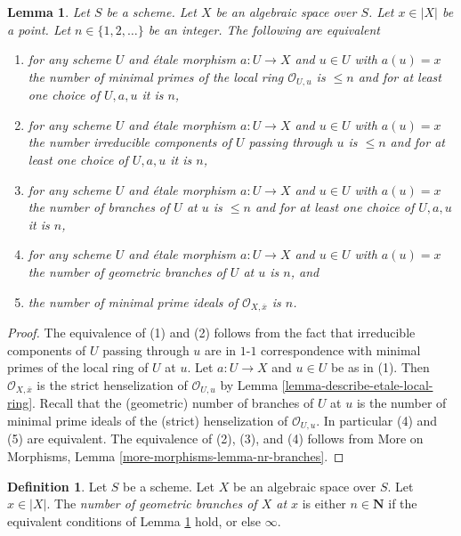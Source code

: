 \documentclass{stacks-project}
\theoremstyle{plain}
\newtheorem{lemma}[subsection]{Lemma}
\theoremstyle{definition}
\newtheorem{definition}[subsection]{Definition}
\theoremstyle{remark}
\numberwithin{equation}{subsection}
\begin{document}
\begin{lemma}
\label{lemma-nr-branches-local-ring}
Let $S$ be a scheme. Let $X$ be an algebraic space over $S$.
Let $x \in |X|$ be a point. Let $n \in \{1, 2, \ldots\}$ be an integer.
The following are equivalent
\begin{enumerate}
\item for any scheme $U$ and \'etale morphism $a : U \to X$ and
$u \in U$ with $a(u) = x$ the number of minimal primes
of the local ring $\mathcal{O}_{U, u}$ is $\leq n$
and for at least one choice of $U, a, u$ it is $n$,
\item for any scheme $U$ and \'etale morphism $a : U \to X$ and
$u \in U$ with $a(u) = x$ the number irreducible components of
$U$ passing through $u$ is $\leq n$ and for at least one choice
of $U, a, u$ it is $n$,
\item for any scheme $U$ and \'etale morphism $a : U \to X$ and $u \in U$
with $a(u) = x$ the number of branches of $U$ at $u$ is $\leq n$
and for at least one choice of $U, a, u$ it is $n$,
\item for any scheme $U$ and \'etale morphism $a : U \to X$ and $u \in U$
with $a(u) = x$ the number of geometric branches of $U$ at $u$ is $n$, and
\item the number of minimal prime ideals of
$\mathcal{O}_{X, \overline{x}}$ is $n$.
\end{enumerate}
\end{lemma}

\begin{proof}
The equivalence of (1) and (2) follows from the fact that irreducible
components of $U$ passing through $u$ are in $1$-$1$ correspondence with
minimal primes of the local ring of $U$ at $u$. Let $a : U \to X$ and
$u \in U$ be as in (1). Then $\mathcal{O}_{X, \overline{x}}$ is the
strict henselization of $\mathcal{O}_{U, u}$ by
Lemma \ref{lemma-describe-etale-local-ring}. Recall that
the (geometric) number of branches of $U$ at $u$ is the number
of minimal prime ideals of the (strict) henselization of $\mathcal{O}_{U, u}$.
In particular (4) and (5) are equivalent.
The equivalence of (2), (3), and (4) follows from
More on Morphisms, Lemma \ref{more-morphisms-lemma-nr-branches}.
\end{proof}

\begin{definition}
\label{definition-number-of-geometric-branches}
Let $S$ be a scheme.
Let $X$ be an algebraic space over $S$.
Let $x \in |X|$. The {\it number of geometric branches of $X$ at $x$} is
either $n \in \mathbf{N}$ if the equivalent conditions
of Lemma \ref{lemma-nr-branches-local-ring}
hold, or else $\infty$.
\end{definition}
\end{document}
